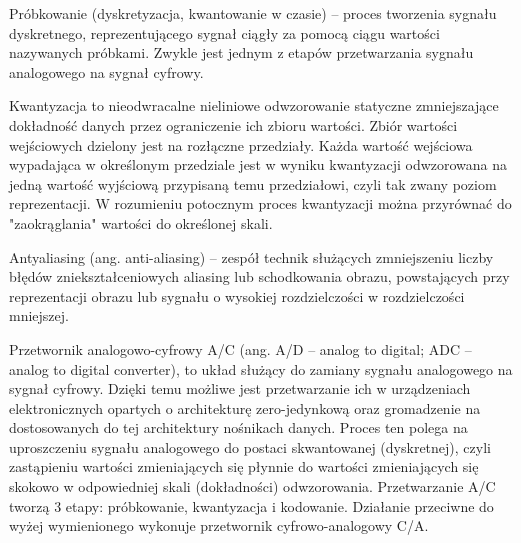 \documentclass{article}
\begin{document}
	Próbkowanie (dyskretyzacja, kwantowanie w czasie) – proces tworzenia sygnału dyskretnego, reprezentującego sygnał ciągły za pomocą ciągu wartości nazywanych próbkami. Zwykle jest jednym z etapów przetwarzania sygnału analogowego na sygnał cyfrowy.\par
	Kwantyzacja to nieodwracalne nieliniowe odwzorowanie statyczne zmniejszające dokładność danych przez ograniczenie ich zbioru wartości. Zbiór wartości wejściowych dzielony jest na rozłączne przedziały. Każda wartość wejściowa wypadająca w określonym przedziale jest w wyniku kwantyzacji odwzorowana na jedną wartość wyjściową przypisaną temu przedziałowi, czyli tak zwany poziom reprezentacji. W rozumieniu potocznym proces kwantyzacji można przyrównać do "zaokrąglania" wartości do określonej skali.\par
	Antyaliasing (ang. anti-aliasing) – zespół technik służących zmniejszeniu liczby błędów zniekształceniowych aliasing lub schodkowania obrazu, powstających przy reprezentacji obrazu lub sygnału o wysokiej rozdzielczości w rozdzielczości mniejszej.\par
	Przetwornik analogowo-cyfrowy A/C (ang. A/D – analog to digital; ADC – analog to digital converter), to układ służący do zamiany sygnału analogowego na sygnał cyfrowy. Dzięki temu możliwe jest przetwarzanie ich w urządzeniach elektronicznych opartych o architekturę zero-jedynkową oraz gromadzenie na dostosowanych do tej architektury nośnikach danych. Proces ten polega na uproszczeniu sygnału analogowego do postaci skwantowanej (dyskretnej), czyli zastąpieniu wartości zmieniających się płynnie do wartości zmieniających się skokowo w odpowiedniej skali (dokładności) odwzorowania. Przetwarzanie A/C tworzą 3 etapy: próbkowanie, kwantyzacja i kodowanie. Działanie przeciwne do wyżej wymienionego wykonuje przetwornik cyfrowo-analogowy C/A.\par
	
\end{document}
